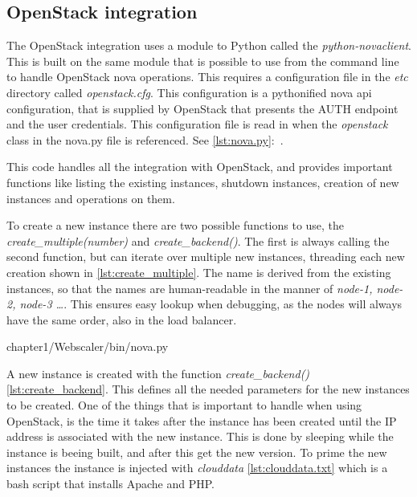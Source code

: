 \subsection{OpenStack integration}
The OpenStack integration uses a module to Python called the
\textit{python-novaclient}. This is built on the same module that is possible
to use from the command line to handle OpenStack nova operations. This
requires a configuration file in the \textit{etc} directory called
\textit{openstack.cfg}. This configuration is a pythonified nova api
configuration, that is supplied by OpenStack that presents the AUTH endpoint
and the user credentials.
This configuration file is read in when the \textit{openstack} class in the
nova.py file is referenced. See \ref{lst:nova.py}:~.

This code handles all the integration with OpenStack, and provides important
functions like listing the existing instances, shutdown instances, creation of
new instances and operations on them.

To create a new instance there are two possible functions to use, the
\textit{create\_multiple(number)} and \textit{create\_backend()}. The first is
always calling the second function, but can iterate over multiple new
instances, threading each new creation shown in \ref{lst:create_multiple}. The name
is derived from the existing instances, so that the names are human-readable in
the manner of \textit{node-1, node-2, node-3 \dots}. This ensures easy lookup
when debugging, as the nodes will always have the same order, also in the load
balancer.

\begin{center}

{chapter1/Webscaler/bin/nova.py}
\end{center}

A new instance is created with the function \textit{create\_backend()}
\ref{lst:create_backend}. This
defines all the needed parameters for the new instances to be created.
One of the things that is important to handle when using OpenStack, is the time
it takes after the instance has been created until the IP address is associated
with the new instance. This is done by sleeping while the instance is beeing
built, and after this get the new version.
To prime the new instances the instance is injected with \textit{clouddata}
\ref{lst:clouddata.txt} which is a bash script that installs Apache and PHP.

